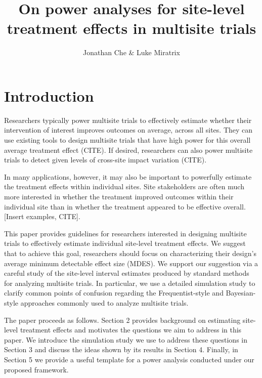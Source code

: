 \documentclass[]{article}
\title{On power analyses for site-level treatment effects in multisite trials}
\author{Jonathan Che \& Luke Miratrix}
\begin{document}
\maketitle


\section{Introduction}

Researchers typically power multisite trials to effectively estimate whether their intervention of interest improves outcomes on average, across all sites.
They can use existing tools to design multisite trials that have high power for this overall average treatment effect (CITE).
If desired, researchers can also power multisite trials to detect given levels of cross-site impact variation (CITE).

In many applications, however, it may also be important to powerfully estimate the treatment effects within individual sites.
Site stakeholders are often much more interested in whether the treatment improved outcomes within their individual site than in whether the treatment appeared to be effective overall.
[Insert examples, CITE].

This paper provides guidelines for researchers interested in designing multisite trials to effectively estimate individual site-level treatment effects.
We suggest that to achieve this goal, researchers should focus on characterizing their design's average minimum detectable effect size (MDES).
We support our suggestion via a careful study of the site-level interval estimates produced by standard methods for analyzing multisite trials.
In particular, we use a detailed simulation study to clarify common points of confusion regarding the Frequentist-style and Bayesian-style approaches commonly used to analyze multisite trials.

The paper proceeds as follows.
Section 2 provides background on estimating site-level treatment effects and motivates the questions we aim to address in this paper.
We introduce the simulation study we use to address these questions in Section 3 and discuss the ideas shown by its results in Section 4.
Finally, in Section 5 we provide a useful template for a power analysis conducted under our proposed framework.
\end{document}
